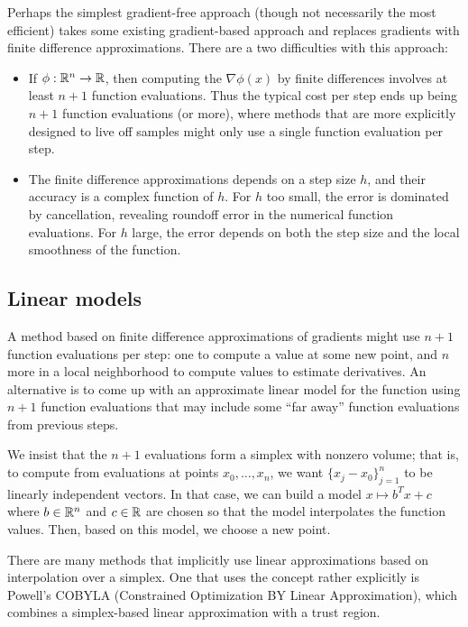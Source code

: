 \documentclass[12pt, leqno]{article} %
\begin{document}
Perhaps the simplest gradient-free approach (though not necessarily
the most efficient) takes some existing gradient-based approach
and replaces gradients with finite difference approximations.
There are a two difficulties with this approach:
\begin{itemize}
  \item If $\phi : \mathbb{R}^n \rightarrow \mathbb{R}$, then computing the
    $\nabla \phi(x)$ by finite differences involves at least $n+1$
    function evaluations.  Thus the typical cost per step ends up
    being $n+1$ function evaluations (or more), where methods that are
    more explicitly designed to live off samples might only use a
    single function evaluation per step.
  \item The finite difference approximations depends on a
    step size $h$, and their accuracy is a complex function of $h$.
    For $h$ too small, the error is dominated by cancellation,
    revealing roundoff error in the numerical function evaluations.
    For $h$ large, the error depends on both the step size and the
    local smoothness of the function.
\end{itemize}

\subsection*{Linear models}

A method based on finite difference approximations of gradients might
use $n+1$ function evaluations per step: one to compute a value at
some new point, and $n$ more in a local neighborhood to compute values
to estimate derivatives.  An alternative is to come up with an
approximate linear model for the function using $n+1$ function
evaluations that may include some ``far away'' function evaluations
from previous steps.

We insist that the $n+1$ evaluations form a simplex with nonzero
volume; that is, to compute from evaluations at points $x_0, \ldots,
x_n$, we want $\{ x_j-x_0 \}_{j=1}^n$ to be linearly independent
vectors.  In that case, we can build a model $x \mapsto b^T x + c$
where $b \in \mathbb{R}^n$ and $c \in \mathbb{R}$ are chosen so that the model
interpolates the function values.  Then, based on this model,
we choose a new point.

There are many methods that implicitly use linear approximations
based on interpolation over a simplex.  One that uses the concept
rather explicitly is Powell's COBYLA (Constrained Optimization BY
Linear Approximation), which combines a simplex-based linear
approximation with a trust region.
\end{document}
